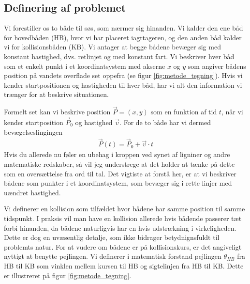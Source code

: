 \documentclass[%
 reprint,
nofootinbib,
aps,
]{revtex4-1}
\begin{document}
\subsection{Definering af problemet}
Vi forestiller os to både til søs, som nærmer sig hinanden. Vi kalder den ene båd for hovedbåden (HB), hvor vi har placeret iagttageren, og den anden båd kalder vi for kollisionsbåden (KB). Vi antager at begge bådene bevæger sig med konstant hastighed, dvs. retlinjet og med konstant fart. Vi beskriver hver båd som et enkelt punkt i et koordinatsystem med akserne $x$ og $y$ som angiver bådens position på vandets overflade set oppefra (se figur \ref{fig:metode_tegning}). Hvis vi kender startpositionen og hastigheden til hver båd, har vi alt den information vi trænger for at beskrive situationen. \par Formelt set kan vi beskrive position $\vec{P} = (x, y)$ som en funktion af tid $t$, når vi kender startposition $\vec{P}_0$ og hastighed $\vec{v}$. For de to både har vi dermed bevægelseslingingen
\begin{align}
  \vec{P}(t) =  \vec{P}_0 + \vec{v}\cdot t
  \label{eq:motion}
\end{align}
Hvis du allerede nu føler en ubehag i kroppen ved synet af ligniner og andre matematiske redskaber, så vil jeg understrege at det holder at tænke på dette som en oversættelse fra ord til tal. Det vigtiste at forstå her, er at vi beskriver bådene som punkter i et koordinatsystem, som bevæger sig i rette linjer med uændret hastighed. \par
Vi definerer en kollision som tilfældet hvor bådene har samme position til samme tidspunkt. I praksis vil man have en kollision allerede hvis bådende passerer tæt forbi hinanden, da bådene naturligvis har en hvis udstrækning i virkeligheden. Dette er dog en uvæsentlig detalje, som ikke bidrager betydnignsfuldt til problemts natur. For at vudere om bådene er på kollisionskurs, er det angiveligt nyttigt at benytte pejlingen. Vi definerer i matematisk forstand pejlingen $\theta_{HB}$ fra HB til KB som vinklen mellem kursen til HB og sigtelinjen fra HB til KB. Dette er illustreret på figur \ref{fig:metode_tegning}.
\end{document}
